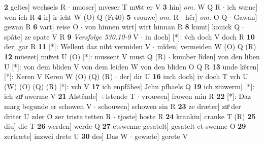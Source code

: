 \documentclass[8pt,a4paper,notitlepage]{article}
\begin{document}
\begin{table}[ht]
\begin{minipage}[t]{0.5\linewidth}
\textbf{2} geltes] wechsels R  $\cdot$ muoser] mveser T mvͤst er V \textbf{3} hin] \textit{om.} W Q R  $\cdot$ ich wæne] wen ich R \textbf{4} ir] ir icht W (O) Q (Fr40) \textbf{5} vrouwe] \textit{om.} R  $\cdot$ hêr] \textit{om.} O Q  $\cdot$ Gawan] gewan R \textbf{6} vart] reise O  $\cdot$ von hinnen wirt] wirt hinnan R \textbf{8} kumt] konick Q  $\cdot$ spâte] ze spate V R \textbf{9} \textit{Versfolge 530.10-9} V   $\cdot$ iu doch] [*]: v́ch doch V doch R \textbf{10} der] gar R \textbf{11} [*]: Wellent daz niht vermiden V  $\cdot$ mîden] vermeiden W (O) Q (R) \textbf{12} müezet] muͦzet U (O) [*]: mussent  V must Q (R)  $\cdot$ kumber lîden] von den liben U [*]: von dem bliden V von dem leiden W von den bliden O Q R \textbf{13} unde kêren] [*]: Keren V Keren W (O) (Q) (R)  $\cdot$ der] dir U \textbf{16} iuch doch] iv doch T vch U (W) (O) (Q) (R) [*]: vch  V \textbf{17} ich enpfâhes] Jchn pfhaels Q \textbf{19} ich ziuwerm] [*]: ich zuͦ uwerme V \textbf{21} Alstênde] ÷lstende T  $\cdot$ vrouwen] frowen min R \textbf{22} [*]: Daz marg begunde er schowen V  $\cdot$ schouwen] schowen sin R \textbf{23} ze dræter] zuͦ der driter U zder O zer triste tetten R  $\cdot$ tjoste] hoste R \textbf{24} krankiu] cranke T (R) \textbf{25} diu] die T \textbf{26} werden] werde Q \textbf{27} etswenne gesatelt] gesatelt et swenne O \textbf{29} zertræte] inzwei drete U \textbf{30} des] Das W  $\cdot$ gewæte] gerete V \newline
\end{minipage}
\end{table}
\end{document}
